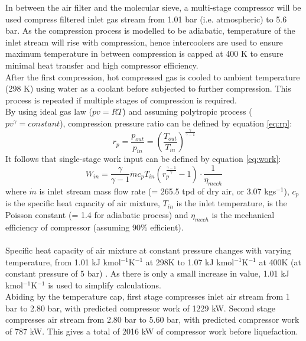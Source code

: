         In between the air filter and the molecular sieve, a multi-stage compressor will be used compress filtered inlet gas stream from 1.01 bar (i.e. atmospheric) to 5.6 bar. As the compression process is modelled to be adiabatic, temperature of the inlet stream will rise with compression, hence intercoolers are used to ensure maximum temperature in between compression is capped at 400 K to ensure minimal heat transfer and high compressor efficiency. \\
        After the first compression, hot compressed gas is cooled to ambient temperature (298 K) using water as a coolant before subjected to further compression. This process is repeated if multiple stages of compression is required.\\
        By using ideal gas law ($pv=RT$) and assuming polytropic process ($pv^\gamma=constant$), compression pressure ratio can be defined by equation \ref{eq:rp}:
        \begin{equation}
            r_p = \frac{p_{out}}{p_{in}} = \left(\frac{T_{out}}{T_{in}}\right)^\frac{\gamma}{\gamma-1}
            \label{eq:rp}
        \end{equation}
        It follows that single-stage work input can be defined by equation \ref{eq:work}:
        \begin{equation}
            W_{in}=\frac{\gamma}{\gamma-1}\dot{m}c_pT_{in}\left(r_p^{\frac{\gamma-1}{\gamma}}-1\right)\cdot\frac{1}{\eta_{mech}}
            \label{eq:work}
        \end{equation}
        where $\dot{m}$ is inlet stream mass flow rate (= 265.5 tpd of dry air, or 3.07 kgs$^{-1}$), $c_p$ is the specific heat capacity of air mixture, $T_{in}$ is the inlet temperature, {\textgamma} is the Poisson constant (= 1.4 for adiabatic process) and ${\eta}_{mech}$ is the mechanical efficiency of compressor (assuming 90\% efficient).\\
        \\
        Specific heat capacity of air mixture at constant pressure changes with varying temperature, from 1.01 kJ kmol$^{-1}$K$^{-1}$ at 298K to 1.07 kJ kmol$^{-1}$K$^{-1}$ at 400K (at constant pressure of 5 bar) \citep{engtoolbox_cp}. As there is only a small increase in value, 1.01 kJ kmol$^{-1}$K$^{-1}$ is used to simplify calculations. \\  
        Abiding by the temperature cap, first stage compresses inlet air stream from 1 bar to 2.80 bar, with predicted compressor work of 1229 kW. Second stage compresses air stream from 2.80 bar to 5.60 bar, with predicted compressor work of 787 kW. This gives a total of 2016 kW of compressor work before liquefaction.
